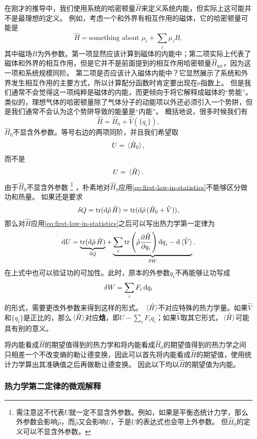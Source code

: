\documentclass[hyperref, UTF8, a4paper]{ctexart}
\newcommand*{\ee}{\mathrm{e}}
\begin{document}
在刚才的推导中，我们使用系统的哈密顿量$\hat{H}$来定义系统内能，但实际上这可能并不是最理想的定义。
例如，考虑一个和外界有相互作用的磁体，它的哈密顿量可能是
\[
    \hat{H} = \text{something about $\mu_i$} + \sum_i \mu_i B,
\]
其中磁场$B$为外参数。第一项显然应该计算到磁体的内能中；第二项实际上代表了磁体和外界的相互作用，但是它并不是前面提到的相互作用哈密顿量$\hat{H}_\text{int}$，因为这一项和系统规模同阶。
第二项是否应该计入磁体内能中？它显然展示了系统和外界发生相互作用的主要方式，所以计算配分函数时肯定要出现在$\ee$指数上。
但是我们通常不会觉得这一项纯粹是磁体的内能，而更倾向于将它解释成磁体的“势能”。
类似的，理想气体的哈密顿量除了气体分子的动能项以外还必须引入一个势阱，但是我们通常不会认为这个势阱导致的能量是“内能”。
概括地说，很多时候我们有
\[
    \hat{H} = \hat{H}_\text{0} + \hat{V}(\{q_i\}),
\]
$\hat{H}_0$不显含外参数。等号右边的两项同阶，并且我们希望取
\[
    U = \expval*{\hat{H}_0},
\]
而不是
\[
    U = \expval*{\hat{H}}.
\]
由于$\hat{H}_0$不显含外参数%
\footnote{需注意这不代表$U$就一定不显含外参数。例如，如果是平衡态统计力学，那么外参数会影响$\hat{\rho}$，而$\hat{\rho}$又会影响$U$，于是$U$的表达式也会带上外参数。
但$\hat{H}_0$的定义可以不显含外参数。}%
，朴素地对$\hat{H}_0$应用\eqref{eq:first-law-in-statistics}不能够区分做功和热量。
如果还是要求
\[
    \var{Q} = \trace (\dd{\hat{\rho}} \hat{H}) = \trace (\dd{\hat{\rho}} (\hat{H}_0 + \hat{V})), 
\]
那么对$\hat{H}$应用\eqref{eq:first-law-in-statistics}之后可以写出热力学第一定律为
\begin{equation}
    \dd{U} = \underbrace{\trace (\dd{\hat{\rho}} \hat{H})}_{\var{Q}} + \underbrace{\sum_i \trace \left( \hat{\rho} \pdv{\hat{H}}{q_i} \right) \dd{q}_i - \dd{\expval*{\hat{V}}}}_{\var{W}}.
\end{equation}
在上式中也可以验证功的可加性。此时，原本的外参数$q_i$不再能够让功写成
\[
    \var{W} = \sum_i F_i \dd{q_i}
\]
的形式，需要更改外参数来得到这样的形式。
$\expval*{\hat{H}}$不对应特殊的热力学量。如果$\hat{V}$和$\{q_i\}$是正比的，那么$\expval*{\hat{H}}$对应\textbf{焓}，即$U - \sum_i F_i q_i$；如果$\hat{V}$取其它形式，$\expval*{\hat{H}}$可能具有别的意义。

将内能看成$\hat{H}$的期望值得到的热力学和将内能看成$\hat{H}_0$的期望值得到的热力学之间只相差一个不改变熵的勒让德变换，因此可以首先将内能看成$\hat{H}$的期望值，使用统计力学算出其准确值之后再做勒让德变换。
因此以下均以$\hat{H}$的期望值为内能。

\subsubsection{热力学第二定律的微观解释}
\end{document}
